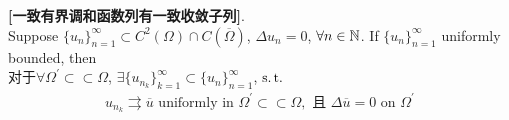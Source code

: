 	\begin{thm}\label{thm 3.6.3}
		\textbf{[一致有界调和函数列有一致收敛子列]}. \\
		Suppose $\{ u_n \}_{n = 1}^{\infty} \subset C^2(\Omega) \cap C \left( \overline{\Omega} \right)$, $\Delta u_n = 0$, $\forall n \in \mathbb{N}$. If $\{ u_n \}_{n = 1}^{\infty}$ uniformly bounded, then \\
		对于$\forall \Omega^{'} \subset \subset \Omega$, $\exists \{ u_{n_k} \}_{k = 1}^{\infty} \subset \{ u_n \}_{n = 1}^{\infty}$, $\operatorname{s.t.}$ 
		\begin{align*}
			u_{n_k} \rightrightarrows \overline{u} \,\, \text{uniformly in} \,\, \Omega^{'} \subset\subset \Omega, \,\, \text{且} \,\, \Delta \overline{u} = 0 \,\, \text{on} \,\, \Omega^{'} 
		\end{align*} 
		
		\vspace*{4em}
		

\end{thm}
